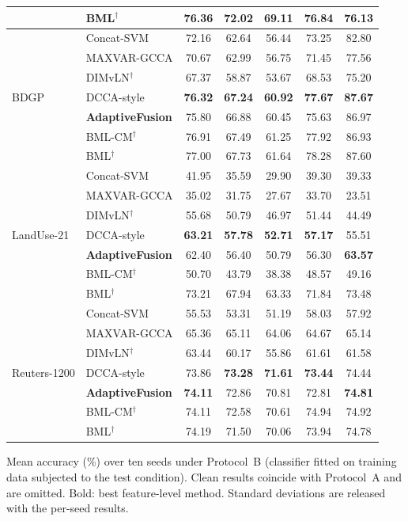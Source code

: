 \begin{table}[!t]
\begin{tabular}{llccccc}
 & BML$^\dagger$ & 76.36 & 72.02 & 69.11 & 76.84 & 76.13 \\
\midrule
\multirow{7}{*}{BDGP} & Concat-SVM & 72.16 & 62.64 & 56.44 & 73.25 & 82.80 \\
 & MAXVAR-GCCA & 70.67 & 62.99 & 56.75 & 71.45 & 77.56 \\
 & DIMvLN$^\dagger$ & 67.37 & 58.87 & 53.67 & 68.53 & 75.20 \\
 & DCCA-style & \textbf{76.32} & \textbf{67.24} & \textbf{60.92} & \textbf{77.67} & \textbf{87.67} \\
 & \textbf{AdaptiveFusion} & 75.80 & 66.88 & 60.45 & 75.63 & 86.97 \\
\cmidrule(lr){2-7}
 & BML-CM$^\dagger$ & 76.91 & 67.49 & 61.25 & 77.92 & 86.93 \\
 & BML$^\dagger$ & 77.00 & 67.73 & 61.64 & 78.28 & 87.60 \\
\midrule
\multirow{7}{*}{LandUse-21} & Concat-SVM & 41.95 & 35.59 & 29.90 & 39.30 & 39.33 \\
 & MAXVAR-GCCA & 35.02 & 31.75 & 27.67 & 33.70 & 23.51 \\
 & DIMvLN$^\dagger$ & 55.68 & 50.79 & 46.97 & 51.44 & 44.49 \\
 & DCCA-style & \textbf{63.21} & \textbf{57.78} & \textbf{52.71} & \textbf{57.17} & 55.51 \\
 & \textbf{AdaptiveFusion} & 62.40 & 56.40 & 50.79 & 56.30 & \textbf{63.57} \\
\cmidrule(lr){2-7}
 & BML-CM$^\dagger$ & 50.70 & 43.79 & 38.38 & 48.57 & 49.16 \\
 & BML$^\dagger$ & 73.21 & 67.94 & 63.33 & 71.84 & 73.48 \\
\midrule
\multirow{7}{*}{Reuters-1200} & Concat-SVM & 55.53 & 53.31 & 51.19 & 58.03 & 57.92 \\
 & MAXVAR-GCCA & 65.36 & 65.11 & 64.06 & 64.67 & 65.14 \\
 & DIMvLN$^\dagger$ & 63.44 & 60.17 & 55.86 & 61.61 & 61.58 \\
 & DCCA-style & 73.86 & \textbf{73.28} & \textbf{71.61} & \textbf{73.44} & 74.44 \\
 & \textbf{AdaptiveFusion} & \textbf{74.11} & 72.86 & 70.81 & 72.81 & \textbf{74.81} \\
\cmidrule(lr){2-7}
 & BML-CM$^\dagger$ & 74.11 & 72.58 & 70.61 & 74.94 & 74.92 \\
 & BML$^\dagger$ & 74.19 & 71.50 & 70.06 & 73.94 & 74.78 \\
\bottomrule
\end{tabular}
\par\smallskip
\parbox{\linewidth}{\scriptsize Mean accuracy (\%) over ten seeds under Protocol~B (classifier fitted on training data subjected to the test condition). Clean results coincide with Protocol~A and are omitted. Bold: best feature-level method. Standard deviations are released with the per-seed results.}
\end{table}
